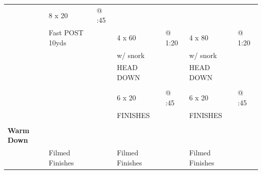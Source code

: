 \documentclass[11pt]{article}
\begin{document}
\begin{tabular}{|L{1.5cm}|L{2.5cm}L{1.8cm}|L{2.5cm}L{1.8cm}|L{2.5cm}L{1.8cm}|}
& 8 x 20 & @ :45 & & & & \\
& Fast POST 10yds & & 4 x 60 & @ 1:20 & 4 x 80 & @ 1:20 \\
& & & w/ snork & & w/ snork & \\
& & & HEAD DOWN & & HEAD DOWN & \\

& & & & & & \\

& & & 6 x 20 & @ :45 & 6 x 20 & @ :45 \\
& & & FINISHES & & FINISHES & \\

& & & & & & \\
\hline

\textbf{Warm Down} & & & & & & \\
\hline
& Filmed Finishes & & Filmed Finishes & & Filmed Finishes & \\
\hline

\end{tabular}
\end{document}
